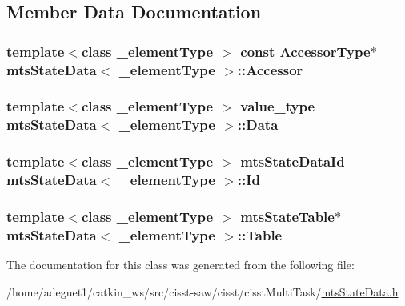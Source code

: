 \subsection{Member Data Documentation}
\hypertarget{classmts_state_data_a41e425be145f2a83a7386a783d3db35c}{
\subsubsection[{Accessor}]{\setlength{\rightskip}{0pt plus 5cm}template$<$class \-\_\-element\-Type $>$ const {\bf Accessor\-Type}$\ast$ {\bf mts\-State\-Data}$<$ \-\_\-element\-Type $>$\-::Accessor\hspace{0.3cm}{\ttfamily [protected]}}}\label{classmts_state_data_a41e425be145f2a83a7386a783d3db35c}
\hypertarget{classmts_state_data_a3f34dd7340ba9ff2f006a00ca7557f15}{
\subsubsection[{Data}]{\setlength{\rightskip}{0pt plus 5cm}template$<$class \-\_\-element\-Type $>$ {\bf value\-\_\-type} {\bf mts\-State\-Data}$<$ \-\_\-element\-Type $>$\-::Data}}\label{classmts_state_data_a3f34dd7340ba9ff2f006a00ca7557f15}
\hypertarget{classmts_state_data_ae5f3c63391a2375ab7f58d1c99bd8521}{
\subsubsection[{Id}]{\setlength{\rightskip}{0pt plus 5cm}template$<$class \-\_\-element\-Type $>$ {\bf mts\-State\-Data\-Id} {\bf mts\-State\-Data}$<$ \-\_\-element\-Type $>$\-::Id\hspace{0.3cm}{\ttfamily [protected]}}}\label{classmts_state_data_ae5f3c63391a2375ab7f58d1c99bd8521}
\hypertarget{classmts_state_data_a8933fedc828fdc64dedb258260be5e4a}{
\subsubsection[{Table}]{\setlength{\rightskip}{0pt plus 5cm}template$<$class \-\_\-element\-Type $>$ {\bf mts\-State\-Table}$\ast$ {\bf mts\-State\-Data}$<$ \-\_\-element\-Type $>$\-::Table\hspace{0.3cm}{\ttfamily [protected]}}}\label{classmts_state_data_a8933fedc828fdc64dedb258260be5e4a}


The documentation for this class was generated from the following file\-:\begin{DoxyCompactItemize}
\item 
/home/adeguet1/catkin\-\_\-ws/src/cisst-\/saw/cisst/cisst\-Multi\-Task/\hyperlink{mts_state_data_8h}{mts\-State\-Data.\-h}\end{DoxyCompactItemize}
